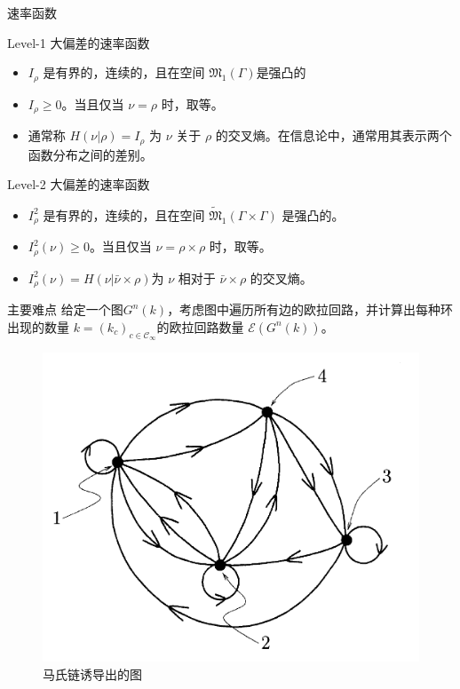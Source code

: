 \documentclass{beamer}
\begin{document}
	\begin{frame}{速率函数}
		\begin{block}{Level-1 大偏差的速率函数}
			\begin{itemize}
				\item $\mathit{I}_{\rho}$ 是有界的，连续的，且在空间 $\mathfrak{M}_1(\Gamma)$是强凸的
				\item $\mathit{I}_{\rho} \ge 0$。当且仅当 $\nu = \rho$ 时，取等。
				\item 通常称 $\mathit{H}(\nu | \rho) = \mathit{I}_{\rho}$ 为 $\nu$ 关于 $\rho$ 的交叉熵。在信息论中，通常用其表示两个函数分布之间的差别。
			\end{itemize}
		\end{block}

		\begin{block}{Level-2 大偏差的速率函数}
			\begin{itemize}
				\item $\mathit{I}^2_{\rho}$ 是有界的，连续的，且在空间 $\widetilde{\mathfrak{M}}_1(\Gamma \times \Gamma)$ 是强凸的。
				\item $\mathit{I}^2_{\rho}(\nu) \ge 0$。当且仅当 $\nu = \rho \times \rho$ 时，取等。
				\item $\mathit{I}_{\rho}^2(\nu) = \mathit{H}(\nu | \bar{\nu} \times \rho)$为 $\nu$ 相对于 $\bar{\nu} \times \rho$ 的交叉熵。
			\end{itemize}
		\end{block}
	\end{frame}

	\begin{frame}{主要难点}
		给定一个图$G^n(k)$，考虑图中遍历所有边的欧拉回路，并计算出每种环出现的数量 $k=(k_c)_{c \in \mathcal{C}_{\infty}}$的欧拉回路数量 $\mathcal{E} (G^n(k))$。
		\begin{figure}[h]
			\centering
			\includegraphics[scale=0.2]{graph1.png}
			\caption*{马氏链诱导出的图}
		\end{figure}
	\end{frame}
\end{document}

